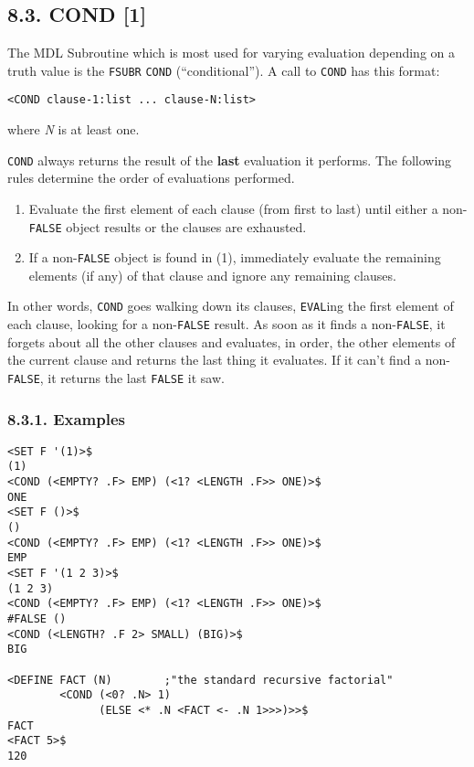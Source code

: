 \documentclass[a4paper,]{article}
\providecommand{\tightlist}{%
  \setlength{\itemsep}{0pt}\setlength{\parskip}{0pt}}
\begin{document}
\subsection{8.3. COND {[}1{]}}\label{cond-1}

The MDL Subroutine which is most used for varying evaluation depending on a truth value is the
\texttt{FSUBR} \texttt{COND} (``conditional''). A call to \texttt{COND}
has this format:

\begin{verbatim}
<COND clause-1:list ... clause-N:list>
\end{verbatim}

where \emph{N} is at least one.

\texttt{COND} always returns the result of the \textbf{last} evaluation it performs. The following rules determine the
order of evaluations performed.

\begin{enumerate}
\def\labelenumi{\arabic{enumi}.}
\tightlist
\item
  Evaluate the first element of each clause (from first to last) until either a non-\texttt{FALSE} object results or the
  clauses are exhausted.
\item
  If a non-\texttt{FALSE} object is found in (1), immediately evaluate the remaining elements (if any) of that clause and
  ignore any remaining clauses.
\end{enumerate}

In other words, \texttt{COND} goes walking down its clauses, \texttt{EVAL}ing the first element of each clause, looking for
a non-\texttt{FALSE} result. As soon as it finds a non-\texttt{FALSE}, it forgets about all the other clauses and
evaluates, in order, the other elements of the current clause and returns the last thing it evaluates. If it can't find a
non-\texttt{FALSE}, it returns the last \texttt{FALSE} it saw.

\subsubsection{8.3.1. Examples}\label{examples-2}

\begin{verbatim}
<SET F '(1)>$
(1)
<COND (<EMPTY? .F> EMP) (<1? <LENGTH .F>> ONE)>$
ONE
<SET F ()>$
()
<COND (<EMPTY? .F> EMP) (<1? <LENGTH .F>> ONE)>$
EMP
<SET F '(1 2 3)>$
(1 2 3)
<COND (<EMPTY? .F> EMP) (<1? <LENGTH .F>> ONE)>$
#FALSE ()
<COND (<LENGTH? .F 2> SMALL) (BIG)>$
BIG

<DEFINE FACT (N)        ;"the standard recursive factorial"
        <COND (<0? .N> 1)
              (ELSE <* .N <FACT <- .N 1>>>)>>$
FACT
<FACT 5>$
120
\end{verbatim}
\end{document}
